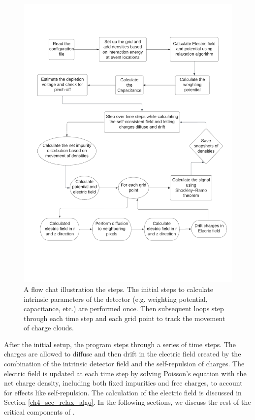 \begin{figure}[!htb]
\centering
\includegraphics[width=0.99\linewidth,trim={2pc 10pc 1.5pc 9pc},clip]{ch3/figs/ehd_flowchart.pdf}
\caption{A flow chat illustration the {\ehd} steps. The initial steps to calculate intrinsic parameters of the detector (e.g. weighting potential, capacitance, etc.) are performed once. Then subsequent loops step through each time step and each grid point to track the movement of charge clouds.}
\label{fig:ehd_flowchart}
\end{figure}

After the initial setup, the program steps through a series of time steps. The charges are allowed to diffuse and then drift in the electric field created by the combination of the intrinsic detector field and the self-repulsion of charges.  The electric field is updated at each time step by solving Poisson's equation with the net charge density, including both fixed impurities and free charges, to account for effects like self-repulsion. The calculation of the electric field is discussed in Section \ref{ch4_sec_relax_algo}. In the following sections, we discuss the rest of the critical components of {\ehd}.

